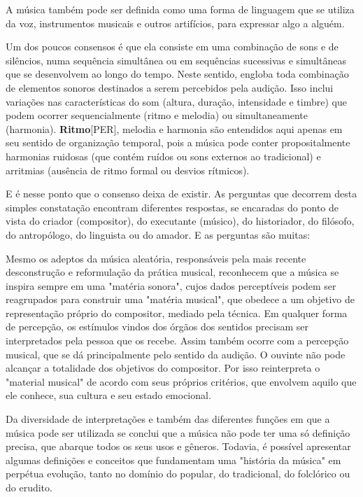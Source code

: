 \documentclass[a4paper,12pt]{article}
\begin{document}
A música também pode ser definida como uma forma de linguagem que se utiliza da voz, instrumentos musicais e outros artifícios, para expressar algo a alguém.

Um dos poucos consensos é que ela consiste em uma combinação de sons e de silêncios, numa sequência simultânea ou em sequências sucessivas e simultâneas que se desenvolvem ao longo do tempo. Neste sentido, engloba toda combinação de elementos sonoros destinados a serem percebidos pela audição. Isso inclui variações nas características do som (altura, duração, intensidade e timbre) que podem ocorrer sequencialmente (ritmo e melodia) ou simultaneamente (harmonia). \textbf{Ritmo}\textsc{[PER]}, melodia e harmonia são entendidos aqui apenas em seu sentido de organização temporal, pois a música pode conter propositalmente harmonias ruidosas (que contém ruídos ou sons externos ao tradicional) e arritmias (ausência de ritmo formal ou desvios rítmicos).

E é nesse ponto que o consenso deixa de existir. As perguntas que decorrem desta simples constatação encontram diferentes respostas, se encaradas do ponto de vista do criador (compositor), do executante (músico), do historiador, do filósofo, do antropólogo, do linguista ou do amador. E as perguntas são muitas:

Mesmo os adeptos da música aleatória, responsáveis pela mais recente desconstrução e reformulação da prática musical, reconhecem que a música se inspira sempre em uma "matéria sonora", cujos dados perceptíveis podem ser reagrupados para construir uma "matéria musical", que obedece a um objetivo de representação próprio do compositor, mediado pela técnica. Em qualquer forma de percepção, os estímulos vindos dos órgãos dos sentidos precisam ser interpretados pela pessoa que os recebe. Assim também ocorre com a percepção musical, que se dá principalmente pelo sentido da audição. O ouvinte não pode alcançar a totalidade dos objetivos do compositor. Por isso reinterpreta o "material musical" de acordo com seus próprios critérios, que envolvem aquilo que ele conhece, sua cultura e seu estado emocional.

Da diversidade de interpretações e também das diferentes funções em que a música pode ser utilizada se conclui que a música não pode ter uma só definição precisa, que abarque todos os seus usos e gêneros. Todavia, é possível apresentar algumas definições e conceitos que fundamentam uma "história da música" em perpétua evolução, tanto no domínio do popular, do tradicional, do folclórico ou do erudito.
\end{document}

